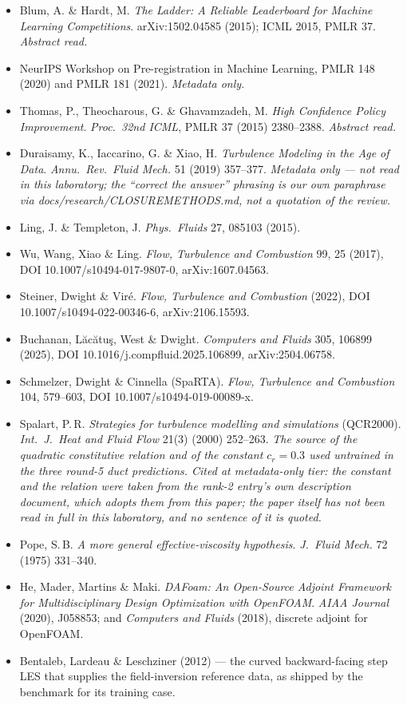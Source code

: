 \documentclass[11pt,a4paper]{article}
\newcommand{\breakus}{\textunderscore\allowbreak}
\newcommand{\code}[1]{{\small\ttfamily\let\_\breakus #1}}
\newcommand{\artifact}[1]{{\footnotesize\ttfamily\let\_\breakus #1}}
\begin{document}
\begin{itemize}
{  autoencoder routing for continual RANS turbulence modelling}. arXiv:2601.09305 (2026).
  \textbf{Read in full.}
\item Blum, A. \& Hardt, M. \emph{The Ladder: A Reliable Leaderboard for Machine Learning
  Competitions}. arXiv:1502.04585 (2015); ICML 2015, PMLR 37. \emph{Abstract read.}
\item NeurIPS Workshop on Pre-registration in Machine Learning, PMLR 148 (2020) and
  PMLR 181 (2021). \emph{Metadata only.}
\item Thomas, P., Theocharous, G. \& Ghavamzadeh, M. \emph{High Confidence Policy
  Improvement}. \emph{Proc.\ 32nd ICML}, PMLR 37 (2015) 2380--2388. \emph{Abstract read.}
\item Duraisamy, K., Iaccarino, G. \& Xiao, H. \emph{Turbulence Modeling in the Age of
  Data}. \emph{Annu.\ Rev.\ Fluid Mech.} 51 (2019) 357--377. \emph{Metadata only --- not
  read in this laboratory; the ``correct the answer'' phrasing is our own paraphrase via
  \artifact{docs/research/CLOSURE\_METHODS.md}, not a quotation of the review.}
\item Ling, J. \& Templeton, J. \emph{Phys.\ Fluids} 27, 085103 (2015).
\item Wu, Wang, Xiao \& Ling. \emph{Flow, Turbulence and Combustion} 99, 25 (2017),
  DOI 10.1007/s10494-017-9807-0, arXiv:1607.04563.
\item Steiner, Dwight \& Vir\'e. \emph{Flow, Turbulence and Combustion} (2022),
  DOI 10.1007/s10494-022-00346-6, arXiv:2106.15593.
\item Buchanan, L\u{a}c\u{a}tu\c{s}, West \& Dwight. \emph{Computers and Fluids} 305,
  106899 (2025), DOI 10.1016/j.compfluid.2025.106899, arXiv:2504.06758.
\item Schmelzer, Dwight \& Cinnella (SpaRTA). \emph{Flow, Turbulence and Combustion} 104,
  579--603, DOI 10.1007/s10494-019-00089-x.
\item Spalart, P.\,R. \emph{Strategies for turbulence modelling and simulations}
  (QCR2000). \emph{Int.\ J.\ Heat and Fluid Flow} 21(3) (2000) 252--263. \emph{The source
  of the quadratic constitutive relation and of the constant $c_r = 0.3$ used untrained in
  the three round-5 duct predictions. Cited at metadata-only tier: the constant and the
  relation were taken from the rank-2 entry's own description document, which adopts them
  from this paper; the paper itself has not been read in full in this laboratory, and no
  sentence of it is quoted.}
\item Pope, S.\,B. \emph{A more general effective-viscosity hypothesis}. \emph{J.\ Fluid
  Mech.} 72 (1975) 331--340.
\item He, Mader, Martins \& Maki. \emph{DAFoam: An Open-Source Adjoint Framework for
  Multidisciplinary Design Optimization with OpenFOAM}. \emph{AIAA Journal} (2020),
  \code{J058853}; and \emph{Computers and Fluids} (2018), discrete adjoint for OpenFOAM.
\item Bentaleb, Lardeau \& Leschziner (2012) --- the curved backward-facing step LES that
  supplies the field-inversion reference data, as shipped by the benchmark for its training
  case.
\end{itemize}
\end{document}

